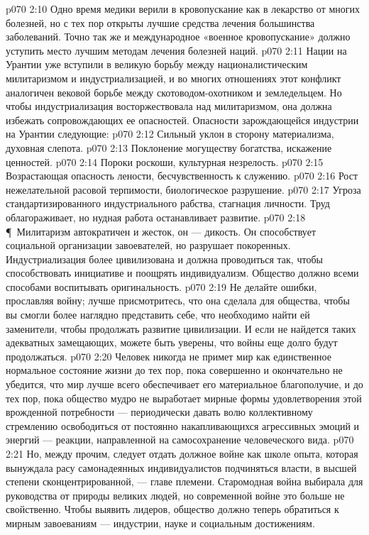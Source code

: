 \vs p070 2:10 Одно время медики верили в кровопускание как в лекарство от многих болезней, но с тех пор открыты лучшие средства лечения большинства заболеваний. Точно так же и международное «военное кровопускание» должно уступить место лучшим методам лечения болезней наций.
\vs p070 2:11 Нации на Урантии уже вступили в великую борьбу между националистическим милитаризмом и индустриализацией, и во многих отношениях этот конфликт аналогичен вековой борьбе между скотоводом\hyp{}охотником и земледельцем. Но чтобы индустриализация восторжествовала над милитаризмом, она должна избежать сопровождающих ее опасностей. Опасности зарождающейся индустрии на Урантии следующие:
\vs p070 2:12 \bibnobreakspace Сильный уклон в сторону материализма, духовная слепота.
\vs p070 2:13 \bibnobreakspace Поклонение могуществу богатства, искажение ценностей.
\vs p070 2:14 \bibnobreakspace Пороки роскоши, культурная незрелость.
\vs p070 2:15 \bibnobreakspace Возрастающая опасность лености, бесчувственность к служению.
\vs p070 2:16 \bibnobreakspace Рост нежелательной расовой терпимости, биологическое разрушение.
\vs p070 2:17 \bibnobreakspace Угроза стандартизированного индустриального рабства, стагнация личности. Труд облагораживает, но нудная работа останавливает развитие.
\vs p070 2:18 \P\ Милитаризм автократичен и жесток, он --- дикость. Он способствует социальной организации завоевателей, но разрушает покоренных. Индустриализация более цивилизована и должна проводиться так, чтобы способствовать инициативе и поощрять индивидуализм. Общество должно всеми способами воспитывать оригинальность.
\vs p070 2:19 Не делайте ошибки, прославляя войну; лучше присмотритесь, что она сделала для общества, чтобы вы смогли более наглядно представить себе, что необходимо найти ей заменители, чтобы продолжать развитие цивилизации. И если не найдется таких адекватных замещающих, можете быть уверены, что войны еще долго будут продолжаться.
\vs p070 2:20 Человек никогда не примет мир как единственное нормальное состояние жизни до тех пор, пока совершенно и окончательно не убедится, что мир лучше всего обеспечивает его материальное благополучие, и до тех пор, пока общество мудро не выработает мирные формы удовлетворения этой врожденной потребности --- периодически давать волю коллективному стремлению освободиться от постоянно накапливающихся агрессивных эмоций и энергий --- реакции, направленной на самосохранение человеческого вида.
\vs p070 2:21 Но, между прочим, следует отдать должное войне как школе опыта, которая вынуждала расу самонадеянных индивидуалистов подчиняться власти, в высшей степени сконцентрированной, --- главе племени. Старомодная война выбирала для руководства от природы великих людей, но современной войне это больше не свойственно. Чтобы выявить лидеров, общество должно теперь обратиться к мирным завоеваниям --- индустрии, науке и социальным достижениям.
